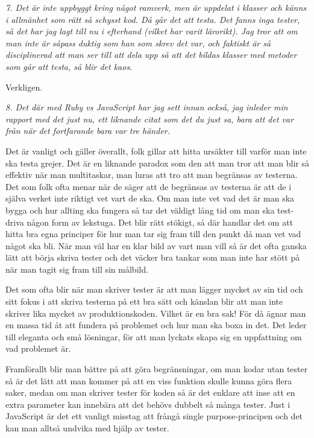 \documentclass[11pt]{article}
\begin{document}
\emph{7. Det är inte uppbyggt kring något ramverk, men är uppdelat i klasser och känns i allmänhet som rätt så schysst kod. Då går det att testa. Det fanns inga tester, så det har jag lagt till nu i efterhand (vilket har varit lärorikt). Jag tror att om man inte är såpass duktig som han som skrev det var, och faktiskt är så disciplinerad att man ser till att dela upp så att det bildas klasser med metoder som går att testa, så blir det kaos.}

Verkligen.

\emph{8. Det där med Ruby vs JavaScript har jag sett innan också, jag inleder min rapport med det just nu, ett liknande citat som det du just sa, bara att det var från när det fortfarande bara var tre händer.}

Det är vanligt och gäller överallt, folk gillar att hitta ursäkter till varför man inte ska testa grejer. Det är en liknande paradox som den att man tror att man blir så effektiv när man multitaskar, man luras att tro att man begränsas av testerna. Det som folk ofta menar när de säger att de begränsas av testerna är att de i själva verket inte riktigt vet vart de ska. Om man inte vet vad det är man ska bygga och hur allting ska fungera så tar det väldigt lång tid om man ska test-driva någon form av lekstuga. Det blir rätt stökigt, så där handlar det om att hitta bra egna principer för hur man tar sig fram till den punkt då man vet vad något ska bli. När man väl har en klar bild av vart man vill så är det ofta ganska lätt att börja skriva tester och det väcker bra tankar som man inte har stött på när man tagit sig fram till sin målbild.

Det som ofta blir när man skriver tester är att man lägger mycket av sin tid och sitt fokus i att skriva testerna på ett bra sätt och känslan blir att man inte skriver lika mycket av produktionskoden. Vilket är en bra sak! För då ägnar man en massa tid åt att fundera på problemet och hur man ska boxa in det. Det leder till eleganta och små lösningar, för att man lyckats skapa sig en uppfattning om vad problemet är.

Framförallt blir man bättre på att göra begränsningar, om man kodar utan tester så är det lätt att man kommer på att en viss funktion skulle kunna göra flera saker, medan om man skriver tester för koden så är det enklare att inse att en extra parameter kan innebära att det behövs dubbelt så många tester. Just i JavaScript är det ett vanligt misstag att frångå single purpose-principen och det kan man alltså undvika med hjälp av tester.
\end{document}
